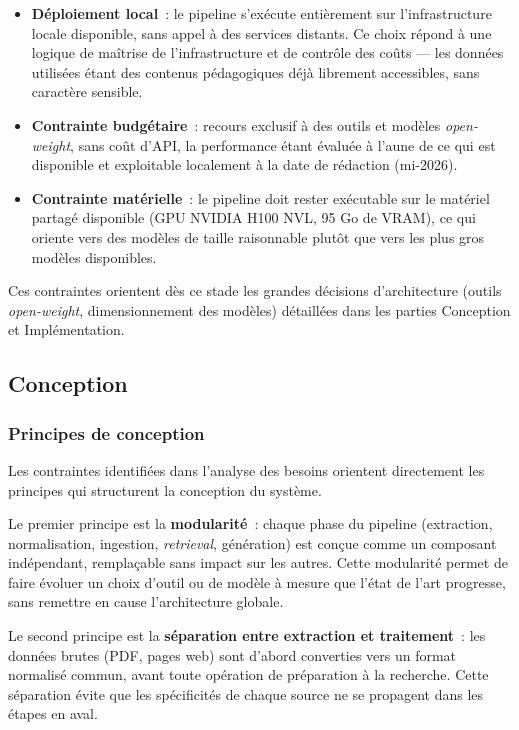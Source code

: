 \documentclass[11pt,a4paper]{article}
\begin{document}
\begin{itemize}
  \item \textbf{Déploiement local}~: le pipeline s'exécute entièrement sur l'infrastructure locale disponible, sans appel à des services distants. Ce choix répond à une logique de maîtrise de l'infrastructure et de contrôle des coûts --- les données utilisées étant des contenus pédagogiques déjà librement accessibles, sans caractère sensible.
  \item \textbf{Contrainte budgétaire}~: recours exclusif à des outils et modèles \textit{open-weight}, sans coût d'API, la performance étant évaluée à l'aune de ce qui est disponible et exploitable localement à la date de rédaction (mi-2026).
  \item \textbf{Contrainte matérielle}~: le pipeline doit rester exécutable sur le matériel partagé disponible (GPU NVIDIA H100 NVL, 95 Go de VRAM), ce qui oriente vers des modèles de taille raisonnable plutôt que vers les plus gros modèles disponibles.
\end{itemize}

Ces contraintes orientent dès ce stade les grandes décisions d'architecture (outils \textit{open-weight}, dimensionnement des modèles) détaillées dans les parties Conception et Implémentation.

\subsection{Conception}

\subsubsection{Principes de conception}

Les contraintes identifiées dans l'analyse des besoins orientent directement les principes qui structurent la conception du système.

Le premier principe est la \textbf{modularité}~: chaque phase du pipeline (extraction, normalisation, ingestion, \textit{retrieval}, génération) est conçue comme un composant indépendant, remplaçable sans impact sur les autres. Cette modularité permet de faire évoluer un choix d'outil ou de modèle à mesure que l'état de l'art progresse, sans remettre en cause l'architecture globale.

Le second principe est la \textbf{séparation entre extraction et traitement}~: les données brutes (PDF, pages web) sont d'abord converties vers un format normalisé commun, avant toute opération de préparation à la recherche. Cette séparation évite que les spécificités de chaque source ne se propagent dans les étapes en aval.
\end{document}
